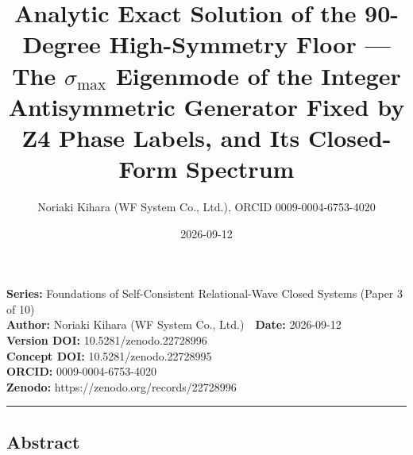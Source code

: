\documentclass[
  a4paper,
]{ltjsarticle}
\title{Analytic Exact Solution of the 90-Degree High-Symmetry Floor ---
The \(\sigma_{\max}\) Eigenmode of the Integer Antisymmetric Generator
Fixed by Z4 Phase Labels, and Its Closed-Form Spectrum}
\author{Noriaki Kihara (WF System Co., Ltd.), ORCID 0009-0004-6753-4020}
\date{2026-09-12}
\begin{document}
\maketitle

\textbf{Series:} Foundations of Self-Consistent Relational-Wave Closed
Systems (Paper 3 of 10)\\
\textbf{Author:} Noriaki Kihara (WF System Co., Ltd.)　\textbf{Date:}
2026-09-12\\
\textbf{Version DOI:} 10.5281/zenodo.22728996\\
\textbf{Concept DOI:} 10.5281/zenodo.22728995\\
\textbf{ORCID:} 0009-0004-6753-4020\\
\textbf{Zenodo:} https://zenodo.org/records/22728996\\

\begin{center}\rule{0.5\linewidth}{0.5pt}\end{center}

\subsection{Abstract}\label{abstract}
\end{document}
